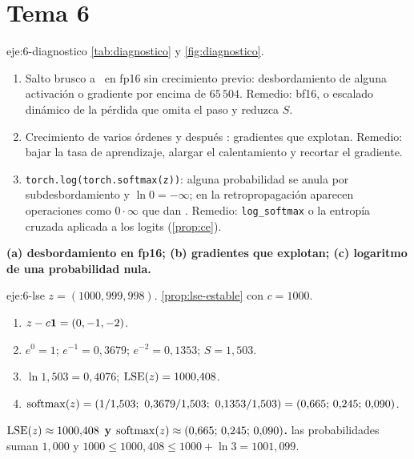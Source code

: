 \section{Tema 6}

\begin{solucion}{eje:6-diagnostico}
\planteamiento \cref{tab:diagnostico} y \cref{fig:diagnostico}.
\pasos
\begin{enumerate}[label=(\alph*)]
  \item Salto brusco a \Inf\ en fp16 sin crecimiento previo: desbordamiento de alguna activación o gradiente por encima de $65\,504$. Remedio: bf16, o escalado dinámico de la pérdida que omita el paso y reduzca $S$.
  \item Crecimiento de varios órdenes y después \NaN: gradientes que explotan. Remedio: bajar la tasa de aprendizaje, alargar el calentamiento y recortar el gradiente.
  \item \texttt{torch.log(torch.softmax(z))}: alguna probabilidad se anula por subdesbordamiento y $\ln 0=-\infty$; en la retropropagación aparecen operaciones como $0\cdot\infty$ que dan \NaN. Remedio: \texttt{log\_softmax} o la entropía cruzada aplicada a los logits (\cref{prop:ce}).
\end{enumerate}
\resultado \textbf{(a) desbordamiento en fp16; (b) gradientes que explotan; (c) logaritmo de una probabilidad nula.}
\end{solucion}

\begin{solucion}{eje:6-lse}
\datos $z=(1000,999,998)$.
\planteamiento \cref{prop:lse-estable} con $c=1000$.
\pasos
\begin{enumerate}[label=\arabic*.]
  \item $z-c\mathbf{1}=(0,-1,-2)$.
  \item $e^{0}=1$; $e^{-1}=0{,}3679$; $e^{-2}=0{,}1353$; $S=1{,}503$.
  \item $\ln 1{,}503=0{,}4076$; $\operatorname{LSE}(z)=1000{,}408$.
  \item $\softmax(z)=(1/1{,}503;\ 0{,}3679/1{,}503;\ 0{,}1353/1{,}503)=(0{,}665;\,0{,}245;\,0{,}090)$.
\end{enumerate}
\resultado \textbf{$\operatorname{LSE}(z)\approx 1000{,}408$ y $\operatorname{softmax}(z)\approx(0{,}665;\,0{,}245;\,0{,}090)$.}
\comprobacion las probabilidades suman $1{,}000$ y $1000\le 1000{,}408\le 1000+\ln 3=1001{,}099$.
\end{solucion}

